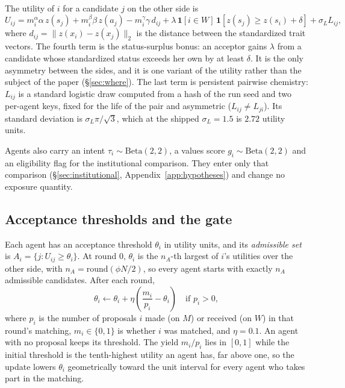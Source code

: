 The utility of $i$ for a candidate $j$ on the other side is
\begin{equation}
U_{ij} = m^{\alpha}_i \alpha\, z(s_j) + m^{\beta}_i \beta\, z(a_j)
       - m^{\gamma}_i \gamma\, d_{ij}
       + \lambda\, \mathbf{1}[i \in W]\, \mathbf{1}\!\left[z(s_j) \ge z(s_i) + \delta\right]
       + \sigma_L L_{ij},
\label{eq:utility}
\end{equation}
where $d_{ij} = \lVert z(x_i) - z(x_j) \rVert_2$ is the distance between the
standardized trait vectors. The fourth term is the status-surplus bonus: an
acceptor gains $\lambda$ from a candidate whose standardized status exceeds her
own by at least $\delta$. It is the only asymmetry between the sides, and it is
one variant of the utility rather than the subject of the paper
(\S\ref{sec:where}). The last term is persistent pairwise chemistry: $L_{ij}$ is a
standard logistic draw computed from a hash of the run seed and two per-agent
keys, fixed for the life of the pair and asymmetric ($L_{ij} \ne L_{ji}$). Its
standard deviation is $\sigma_L \pi/\sqrt3$, which at the shipped $\sigma_L = 1.5$
is $2.72$ utility units.

Agents also carry an intent $\tau_i \sim \mathrm{Beta}(2,2)$, a values score $g_i
\sim \mathrm{Beta}(2,2)$ and an eligibility flag for the institutional comparison.
They enter only that comparison (\S\ref{sec:institutional},
Appendix~\ref{app:hypotheses}) and change no exposure quantity.

\subsection{Acceptance thresholds and the gate}
\label{sec:gate}

Each agent has an acceptance threshold $\theta_i$ in utility units, and its
\emph{admissible set} is $A_i = \{ j : U_{ij} \ge \theta_i \}$. At round 0,
$\theta_i$ is the $n_A$-th largest of $i$'s utilities over the other side, with
$n_A = \mathrm{round}(\phi N/2)$, so every agent starts with exactly $n_A$
admissible candidates. After each round,
\begin{equation}
\theta_i \leftarrow \theta_i + \eta \left( \frac{m_i}{p_i} - \theta_i \right)
\quad \text{if } p_i > 0,
\label{eq:theta}
\end{equation}
where $p_i$ is the number of proposals $i$ made (on $M$) or received (on $W$) in
that round's matching, $m_i \in \{0, 1\}$ is whether $i$ was matched, and $\eta =
0.1$. An agent with no proposal keeps its threshold. The yield $m_i/p_i$ lies in
$[0, 1]$ while the initial threshold is the tenth-highest utility an agent has,
far above one, so the update lowers $\theta_i$ geometrically toward the unit
interval for every agent who takes part in the matching.

